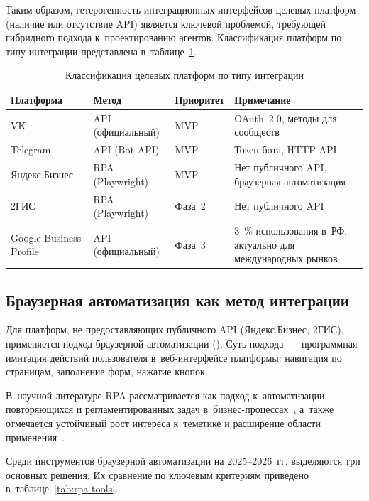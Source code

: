 Таким образом, гетерогенность интеграционных интерфейсов целевых платформ (наличие или отсутствие API) является ключевой проблемой, требующей гибридного подхода к~проектированию агентов. Классификация платформ по типу интеграции представлена в~таблице~\ref{tab:platform-class}.

\begin{table}[H]
  \caption{Классификация целевых платформ по типу интеграции}
  \label{tab:platform-class}
  \small
  \begin{tabularx}{\textwidth}{|p{3.5cm}|p{2.5cm}|p{2cm}|X|}
    \hline
    \textbf{Платформа} & \textbf{Метод} & \textbf{Приоритет} & \textbf{Примечание} \\
    \hline
    VK & API (официальный) & MVP & OAuth~2.0, методы для сообществ \\
    \hline
    Telegram & API (Bot API) & MVP & Токен бота, HTTP-API \\
    \hline
    Яндекс.Бизнес & RPA (Playwright) & MVP & Нет публичного API, браузерная автоматизация \\
    \hline
    2ГИС & RPA (Playwright) & Фаза~2 & Нет публичного API \\
    \hline
    Google Business Profile & API (официальный) & Фаза~3 & 3~\% использования в~РФ, актуально для международных рынков \\
    \hline
  \end{tabularx}
\end{table}

\subsection{Браузерная автоматизация как метод интеграции}
\label{subsec:rpa}

Для платформ, не предоставляющих публичного API (Яндекс.Бизнес, 2ГИС), применяется подход браузерной автоматизации (). Суть подхода~--- программная имитация действий пользователя в~веб-интерфейсе платформы: навигация по страницам, заполнение форм, нажатие кнопок.

В~научной литературе RPA рассматривается как подход к~автоматизации повторяющихся и регламентированных задач в~бизнес-процессах~\cite{src:6}, а~также отмечается устойчивый рост интереса к~тематике и расширение области применения~\cite{src:7}.

Среди инструментов браузерной автоматизации на 2025--2026~гг. выделяются три основных решения. Их сравнение по ключевым критериям приведено в~таблице~\ref{tab:rpa-tools}.

